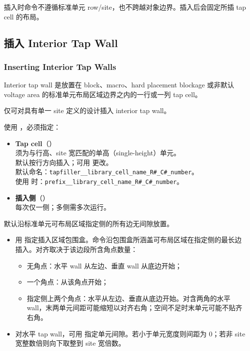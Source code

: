 插入时命令不遵循标准单元 row/site，也不跨越对象边界。插入后会固定所插 tap cell 的布局。

\subsection{插入 Interior Tap Wall}
\subsubsection*{Inserting Interior Tap Walls}

Interior tap wall 是放置在 block、macro、hard placement blockage 或非默认 voltage area 的标准单元布局区域边界之内的一行或一列 tap cell。

\begin{noteBox}
仅可对具有单一 site 定义的设计插入 interior tap wall。
\end{noteBox}

使用 ，必须指定：
\begin{itemize}
  \item \textbf{Tap cell}（）\\
        须为与行高、site 宽匹配的单高（single-height）单元。\\
        默认按行方向插入；可用  更改。\\
        默认命名：\texttt{tapfiller\_\_library\_cell\_name\_R\#\_C\#\_number}。\\
        使用  时：\texttt{prefix\_\_library\_cell\_name\_R\#\_C\#\_number}。
  \item \textbf{插入侧}（）\\
        每次仅一侧；多侧需多次运行。
\end{itemize}

默认沿标准单元可布局区域指定侧的所有边无间隙放置。
\begin{itemize}
  \item 用  指定插入区域包围盒。命令沿包围盒所涵盖可布局区域在指定侧的最长边插入。对齐取决于该边段所含角点数量：
        \begin{itemize}
          \item 无角点：水平 wall 从左边、垂直 wall 从底边开始；
          \item 一个角点：从该角点开始；
          \item 指定侧上两个角点：水平从左边、垂直从底边开始。对含两角的水平 wall，末两单元间距可能缩短以对齐右角；空间不足时末单元可能不贴齐右角。
        \end{itemize}
  \item 对水平 tap wall，可用  指定单元间隙。若小于单元宽度则间距为 0；若非 site 宽整数倍则向下取整到 site 宽倍数。
\end{itemize}


